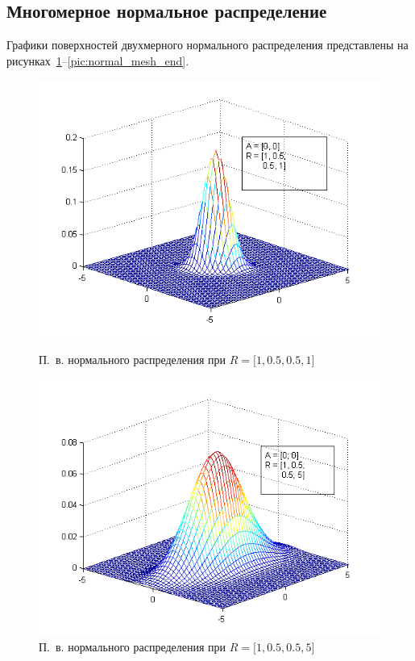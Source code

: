 \subsection{Многомерное нормальное распределение}

Графики поверхностей двухмерного нормального распределения представлены
на рисунках~\ref{pic:normal_mesh_start}--\ref{pic:normal_mesh_end}.

\begin{figure}[h!]
  \begin{minipage}[h!]{0.47\linewidth}
    \includegraphics[width=1\linewidth]{pic/new/normal_mesh_1}
    \caption{П.~в. нормального распределения при
    $ R = \big[1, 0.5, 0.5, 1 \big] $
  }
    \label{pic:normal_mesh_start}
  \end{minipage}
  \hfill
  \begin{minipage}[h!]{0.47\linewidth}
    \vspace{4mm}
    \includegraphics[width=1\linewidth]{pic/new/normal_mesh_2}
    \caption{П.~в. нормального распределения при
    $ R = \big[1, 0.5, 0.5, 5 \big] $}
  \end{minipage}
\end{figure}


